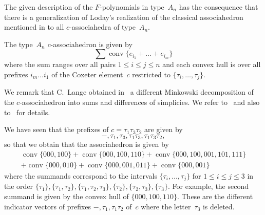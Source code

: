 \documentclass[ALCO,Unicode,ThmDefs]{cedram}
\DeclareMathOperator{\conv}{conv}
\begin{document}
The given description of the $F$-polynomials in type~$A_n$ has the consequence that there is a generalization of Loday's realization of the classical associahedron mentioned in  to all $c$-associahedra of type~$A_n$.

\begin{coro}
The type~$A_n$ $c$-associahedron is given by
\[
\sum \conv\{ e_{i_1} + \dots + e_{i_m} \}
\]
where the sum ranges over all pairs $1 \leq i \leq j \leq n$ and each convex hull is over all prefixes $i_m \dots i_1$ of the Coxeter element~$c$ restricted to $\{\tau_i,\dots,\tau_{j}\}$.
\end{coro}

We remark that C.~Lange obtained in~\cite{Lan2013} a different Minkowski decomposition of the $c$-associahedron into sums and differences of simplicies. We refer to~\cite[Theorem~4.3]{Lan2013} and also to~\cite[Section~4]{LP2013} for details.

\begin{exem}
We have seen that the prefixes of $c = \tau_1\tau_3\tau_2$ are given by
\[
-,\tau_1,\tau_3,\tau_1\tau_3,\tau_1\tau_3\tau_2,
\]
so that we obtain that the associahedron is given by
\begin{multline*}
\conv\{000,100\} + \conv\{000,100,110\} + \conv\{000,100,001,101,111\} \\
+ \conv\{000,010\} + \conv\{000,001,011\} + \conv\{000,001\}
\end{multline*}
where the summands correspond to the intervals $\{\tau_i,\dots,\tau_j\}$ for $1 \leq i \leq j \leq 3$ in the order $\{\tau_1\}, \{\tau_1,\tau_2\}, \{\tau_1,\tau_2,\tau_3\}, \{\tau_2\}, \{\tau_2,\tau_3\}, \{\tau_3\}$. For example, the second summand is given by the convex hull of $\{000,100,110\}$. These are the different indicator vectors of prefixes $-,\tau_1,\tau_1\tau_2$ of~$c$ where the letter~$\tau_3$ is deleted.
\end{exem}




\end{document}
